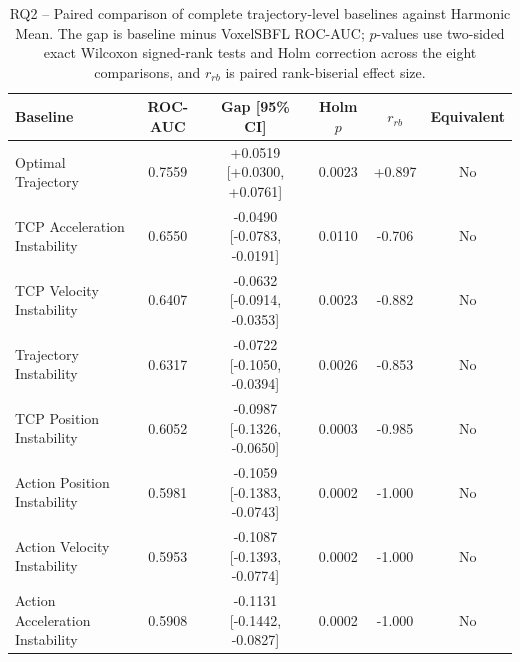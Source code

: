 \begin{table}[t]
\centering
\caption{RQ2 -- Paired comparison of complete trajectory-level baselines against Harmonic Mean. The gap is baseline minus VoxelSBFL ROC-AUC; $p$-values use two-sided exact Wilcoxon signed-rank tests and Holm correction across the eight comparisons, and $r_{rb}$ is paired rank-biserial effect size.}
\label{tab:rq2-baseline-statistics-exact}
{\scriptsize
\setlength{\tabcolsep}{4pt}
\begin{tabular}{lccccc}
\toprule
Baseline & ROC-AUC & Gap [95\% CI] & Holm $p$ & $r_{rb}$ & Equivalent \\
\midrule
Optimal Trajectory & 0.7559 & +0.0519 [+0.0300, +0.0761] & 0.0023 & +0.897 & No \\
TCP Acceleration Instability & 0.6550 & -0.0490 [-0.0783, -0.0191] & 0.0110 & -0.706 & No \\
TCP Velocity Instability & 0.6407 & -0.0632 [-0.0914, -0.0353] & 0.0023 & -0.882 & No \\
Trajectory Instability & 0.6317 & -0.0722 [-0.1050, -0.0394] & 0.0026 & -0.853 & No \\
TCP Position Instability & 0.6052 & -0.0987 [-0.1326, -0.0650] & 0.0003 & -0.985 & No \\
Action Position Instability & 0.5981 & -0.1059 [-0.1383, -0.0743] & 0.0002 & -1.000 & No \\
Action Velocity Instability & 0.5953 & -0.1087 [-0.1393, -0.0774] & 0.0002 & -1.000 & No \\
Action Acceleration Instability & 0.5908 & -0.1131 [-0.1442, -0.0827] & 0.0002 & -1.000 & No \\
\bottomrule
\end{tabular}
}
\end{table}
